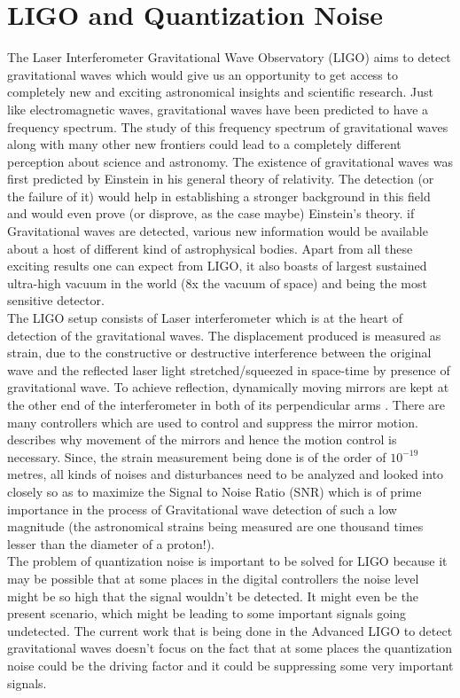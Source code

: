 \documentclass[colorlinks=true,pdfstartview=FitV,linkcolor=blue,
            citecolor=red,urlcolor=magenta]{ligodoc}
\begin{document}
\section{LIGO and Quantization Noise}
The Laser Interferometer Gravitational Wave Observatory (LIGO) \cite{LIGO} aims to detect gravitational waves \cite{GWD} which would give us an opportunity to get access to completely new and exciting astronomical insights and scientific research. Just like electromagnetic waves, gravitational waves have been predicted to have a frequency spectrum. The study of this frequency spectrum of gravitational waves along with many other new frontiers could lead to a completely different perception about science and astronomy. The existence of gravitational waves was first predicted by Einstein in his general theory of relativity. The detection (or the failure of it) would help in establishing a stronger background in this field and would even prove (or disprove, as the case maybe) Einstein's theory. if Gravitational waves are detected, various new information would be available about a host of different kind of astrophysical bodies. Apart from all these exciting results one can expect from LIGO, it also boasts of largest sustained ultra-high vacuum in the world (8x the vacuum of space) and being the most sensitive detector. \\The LIGO setup consists of Laser interferometer \cite{Interferometer} which is at the heart of detection of the gravitational waves. The displacement produced is measured as strain, due to the constructive or destructive interference between the original wave and the reflected laser light stretched/squeezed in space-time by presence of gravitational wave. To achieve reflection, dynamically moving mirrors are kept at the other end of the interferometer in both of its perpendicular arms \cite{Interferometer}. There are many controllers which are used to control and suppress the mirror motion. \cite{Carbone} describes why movement of the mirrors and hence the motion control is necessary. Since, the strain measurement being done is of the order of $10^{-19}$ metres, all kinds of noises and disturbances need to be analyzed and looked into closely so as to maximize the Signal to Noise Ratio (SNR) which is of prime importance in the process of Gravitational wave detection of such a low magnitude (the astronomical strains being measured are one thousand times lesser than the diameter of a proton!).
\\
The problem of quantization noise is important to be solved for LIGO because it may be possible that at some places in the digital controllers the noise level might be so high that the signal wouldn't be detected. It might even be the present scenario, which might be leading to some important signals going undetected. The current work that is being done in the Advanced LIGO to detect gravitational waves doesn't focus on the fact that at some places the quantization noise could be the driving factor and it could be suppressing some very important signals.\\
\end{document}
